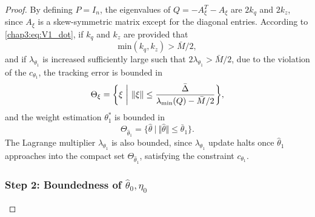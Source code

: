 \begin{proof}
By defining $P=I_n$, the eigenvalues of $Q=-A_\xi^T-A_\xi$ are $2k_q$ and $2k_z$, since $A_\xi$ is a skew-symmetric matrix except for the diagonal entries.
According to \eqref{chap3:eq:V1_dot}, if $k_q$ and $k_z$ are provided that
\begin{equation}
    \text{min}(k_q,k_z)>\bar M/2
    ,
    \label{chap3:eq:stable_cond}
\end{equation}
and if $\lambda_{\theta_1}$ is increased sufficiently large such that $2\lambda_{\theta_1}>\bar M/2$, due to the violation of the $c_{\theta_1}$, the tracking error is bounded in 
\begin{equation}
    \Theta_\xi = 
    \bigg\{
        \xi \ \bigg\vert\ \Vert\xi\Vert \le  
        {
            \bar \Delta \over \lambda _\text{min}(Q)-\bar M/2
        } 
    \bigg\}
    ,
\end{equation}
and the weight estimation $\theta^*_1$ is bounded in 
\begin{equation}
    \Theta_{\hat\theta_1} = 
    \{ 
        \hat\theta 
        \ 
        \vert
        \ 
        \Vert\hat\theta\Vert \le  
        \bar\theta_1
    \}
    .
\end{equation}
The Lagrange multiplier $\lambda_{\theta_1}$ is also bounded, since $\lambda_{\theta_1}$ update halts once $\hat\theta_1$ approaches into the compact set $\Theta_{\hat\theta_1}$, satisfying the constraint $c_{\theta_1}$.

\subsubsection{Step 2: Boundedness of $\hat\theta_0,\eta_0$}


\end{proof}
